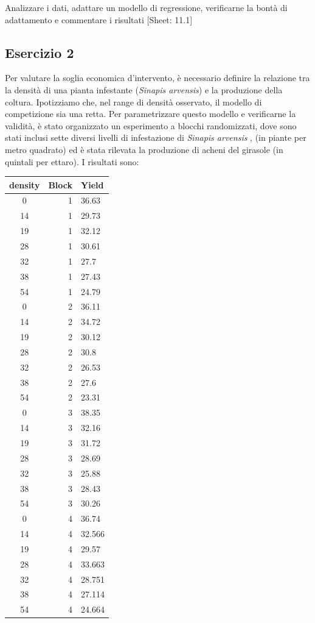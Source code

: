 \documentclass[a4paper,12pt,oneside]{book}
\begin{document}
Analizzare i dati, adattare un modello di regressione, verificarne la bontà di adattamento e commentare i risultati
{[}Sheet: 11.1{]}

\hypertarget{esercizio-2-7}{%
\subsection{Esercizio 2}\label{esercizio-2-7}}

Per valutare la soglia economica d'intervento, è necessario definire la relazione tra la densità di una pianta infestante (\emph{Sinapis arvensis}) e la produzione della coltura. Ipotizziamo che, nel range di densità osservato, il modello di competizione sia una retta. Per parametrizzare questo modello e verificarne la validità, è stato organizzato un esperimento a blocchi randomizzati, dove sono stati inclusi sette diversi livelli di infestazione di \emph{Sinapis arvensis} , (in piante per metro quadrato) ed è stata rilevata la produzione di acheni del girasole (in quintali per ettaro). I risultati sono:

\begin{longtable}[]{@{}crl@{}}
\toprule()
density & Block & Yield \\
\midrule()
\endhead
0 & 1 & 36.63 \\
14 & 1 & 29.73 \\
19 & 1 & 32.12 \\
28 & 1 & 30.61 \\
32 & 1 & 27.7 \\
38 & 1 & 27.43 \\
54 & 1 & 24.79 \\
0 & 2 & 36.11 \\
14 & 2 & 34.72 \\
19 & 2 & 30.12 \\
28 & 2 & 30.8 \\
32 & 2 & 26.53 \\
38 & 2 & 27.6 \\
54 & 2 & 23.31 \\
0 & 3 & 38.35 \\
14 & 3 & 32.16 \\
19 & 3 & 31.72 \\
28 & 3 & 28.69 \\
32 & 3 & 25.88 \\
38 & 3 & 28.43 \\
54 & 3 & 30.26 \\
0 & 4 & 36.74 \\
14 & 4 & 32.566 \\
19 & 4 & 29.57 \\
28 & 4 & 33.663 \\
32 & 4 & 28.751 \\
38 & 4 & 27.114 \\
54 & 4 & 24.664 \\
\bottomrule()
\end{longtable}
\end{document}
